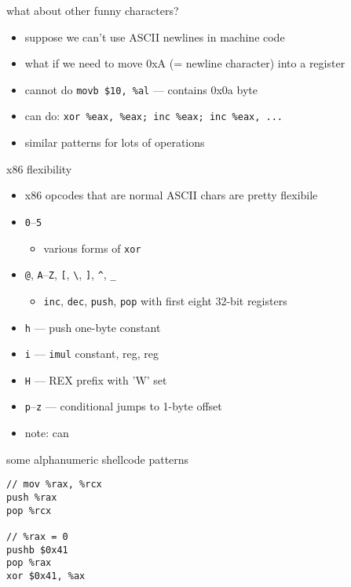 \begin{frame}{what about other funny characters?}
    \begin{itemize}
    \item suppose we can't use ASCII newlines in machine code
    \item what if we need to move 0xA (= newline character) into a register
    \vspace{.5cm}
    \item cannot do \texttt{movb \$10, \%al} --- contains 0x0a byte
    \item can do: \texttt{xor \%eax, \%eax; inc \%eax; inc \%eax, ...}
    \vspace{.5cm}
    \item similar patterns for lots of operations
    \end{itemize}
\end{frame}

\begin{frame}{x86 flexibility}
    \begin{itemize}
    \item x86 opcodes that are normal ASCII chars are pretty flexibile
    \item {\tt 0}--{\tt 5}
        \begin{itemize}
        \item various forms of {\tt xor}
        \end{itemize}
    \item {\tt @}, {\tt A}--{\tt Z}, {\tt [}, {\tt \textbackslash}, {\tt ]}, {\tt \textasciicircum}, {\tt \_}
        \begin{itemize}
        \item {\tt inc}, {\tt dec}, {\tt push}, {\tt pop} with first eight 32-bit registers
        \end{itemize}
    \item {\tt h} --- push one-byte constant
    \item {\tt i} --- {\tt imul} constant, reg, reg
    \item {\tt H} --- REX prefix with 'W' set
    \item {\tt p}--{\tt z} --- conditional jumps to 1-byte offset
    \vspace{.5cm}
    \item<2> note: can 
    \end{itemize}
\end{frame}

\begin{frame}[fragile]{some alphanumeric shellcode patterns}
\begin{Verbatim}[fontsize=\small]
// mov %rax, %rcx
push %rax
pop %rcx

// %rax = 0
pushb $0x41
pop %rax
xor $0x41, %ax
\end{Verbatim}
\end{frame}


